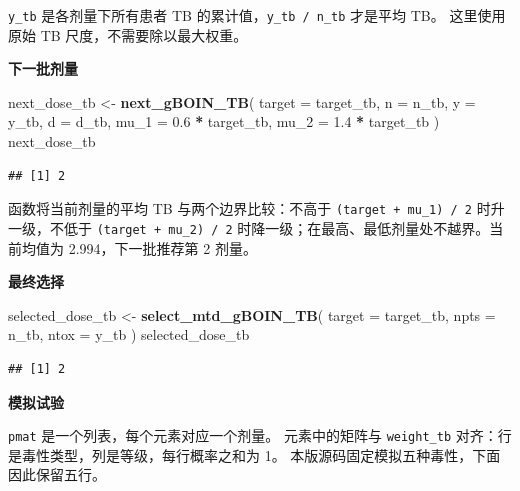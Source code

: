 \documentclass[
  chinese,
]{article}
\newenvironment{Shaded}{\begin{snugshade}}{\end{snugshade}}
\newcommand{\AttributeTok}[1]{\textcolor[rgb]{0.13,0.29,0.53}{#1}}
\newcommand{\FloatTok}[1]{\textcolor[rgb]{0.00,0.00,0.81}{#1}}
\newcommand{\FunctionTok}[1]{\textcolor[rgb]{0.13,0.29,0.53}{\textbf{#1}}}
\newcommand{\NormalTok}[1]{#1}
\newcommand{\OtherTok}[1]{\textcolor[rgb]{0.56,0.35,0.01}{#1}}
\newcommand{\SpecialCharTok}[1]{\textcolor[rgb]{0.81,0.36,0.00}{\textbf{#1}}}
\begin{document}
\texttt{y\_tb} 是各剂量下所有患者 TB 的累计值，\texttt{y\_tb\ /\ n\_tb}
才是平均 TB。 这里使用原始 TB 尺度，不需要除以最大权重。

\textbf{下一批剂量}

\begin{Shaded}
\begin{Highlighting}[]
\NormalTok{next\_dose\_tb }\OtherTok{\textless{}{-}} \FunctionTok{next\_gBOIN\_TB}\NormalTok{(}
  \AttributeTok{target =}\NormalTok{ target\_tb, }\AttributeTok{n =}\NormalTok{ n\_tb, }\AttributeTok{y =}\NormalTok{ y\_tb, }\AttributeTok{d =}\NormalTok{ d\_tb,}
  \AttributeTok{mu\_1 =} \FloatTok{0.6} \SpecialCharTok{*}\NormalTok{ target\_tb, }\AttributeTok{mu\_2 =} \FloatTok{1.4} \SpecialCharTok{*}\NormalTok{ target\_tb}
\NormalTok{)}
\NormalTok{next\_dose\_tb}
\end{Highlighting}
\end{Shaded}

\begin{verbatim}
## [1] 2
\end{verbatim}

函数将当前剂量的平均 TB 与两个边界比较：不高于
\texttt{(target\ +\ mu\_1)\ /\ 2} 时升一级，不低于
\texttt{(target\ +\ mu\_2)\ /\ 2}
时降一级；在最高、最低剂量处不越界。当前均值为 2.994，下一批推荐第 2
剂量。

\textbf{最终选择}

\begin{Shaded}
\begin{Highlighting}[]
\NormalTok{selected\_dose\_tb }\OtherTok{\textless{}{-}} \FunctionTok{select\_mtd\_gBOIN\_TB}\NormalTok{(}
  \AttributeTok{target =}\NormalTok{ target\_tb, }\AttributeTok{npts =}\NormalTok{ n\_tb, }\AttributeTok{ntox =}\NormalTok{ y\_tb}
\NormalTok{)}
\NormalTok{selected\_dose\_tb}
\end{Highlighting}
\end{Shaded}

\begin{verbatim}
## [1] 2
\end{verbatim}

\textbf{模拟试验}

\texttt{pmat} 是一个列表，每个元素对应一个剂量。 元素中的矩阵与
\texttt{weight\_tb} 对齐：行是毒性类型，列是等级，每行概率之和为 1。
本版源码固定模拟五种毒性，下面因此保留五行。
\end{document}
